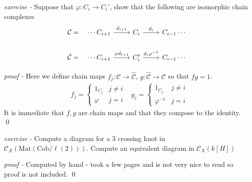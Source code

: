 \documentclass[11pt]{article}
\theoremstyle{definition}
\begin{document}

    \emph{exercise - } Suppose that \(\varphi: C_i \to C_i'\), show that the following are isomorphic chain complexes
    \begin{equation*}
        \begin{tikzcd}
            \mathcal{C} = \quad \cdots C_{i+1} \arrow[r,"{d_{i+1}}"] &C_i \arrow[r,"{d_i}"] &C_{i-1}\cdots  \\
            \hat{\mathcal{C}} = \quad \cdots C_{i+1} \arrow[r,"{\varphi d_{i+1}}"] &C_i' \arrow[r,"{d_i \varphi^{-1}}"] &C_{i-1}\cdots
        \end{tikzcd}
    \end{equation*}

    \emph{proof - } Here we define chain maps \(f_j: \mathcal{C} \to \hat{\mathcal{C}}\), \(g: \hat{\mathcal{C}} \to \mathcal{C}\) so that \(fg = 1\).
    \begin{align*}
        &f_j = \begin{cases}
            1_{C_j} & j \neq i \\
            \varphi & j = i
        \end{cases} &g_j = \begin{cases}
            1_{C_j} & j\neq i\\
            \varphi^{-1} &j=i
        \end{cases}
    \end{align*}
    It is immediate that \(f,g\) are chain maps and that they compose to the identity. \qed



    \emph{exercise - } Compute a diagram for a 3 crossing knot in \(\mathcal{C}_X(\text{Mat}(\text{Cob}/\ell(2)))\). Compute an equivalent diagram in \(\mathcal{C}_X(k[H])\)

    \emph{proof - } Computed by hand - took a few pages and is not very nice to read so proof is not included. \qed


\end{document}
